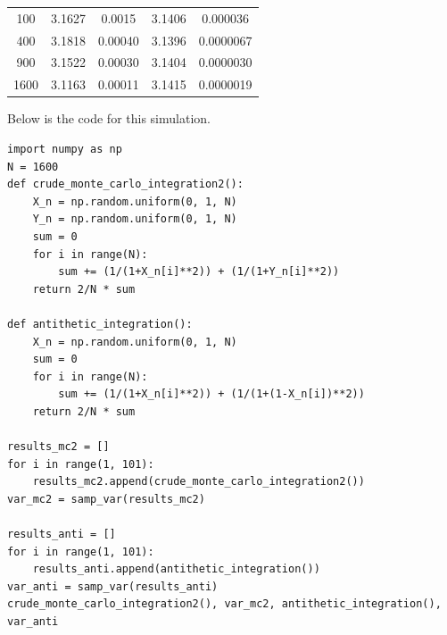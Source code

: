 \documentclass[12pt, letterpaper]{article}
\begin{document}
\begin{enumerate}[a.]
\begin{center}
\begin{tabular}{c | c c | c c}
        \hline 
        100 & 3.1627 & 0.0015 & 3.1406 & 0.000036 \\
        400 & 3.1818 & 0.00040 & 3.1396 & 0.0000067 \\
        900 & 3.1522 & 0.00030 & 3.1404 & 0.0000030 \\
        1600 & 3.1163 & 0.00011 & 3.1415 & 0.0000019 \\
    \end{tabular}
    \end{center}
    Below is the code for this simulation.
    \begin{verbatim}
import numpy as np
N = 1600 
def crude_monte_carlo_integration2():
    X_n = np.random.uniform(0, 1, N)
    Y_n = np.random.uniform(0, 1, N)
    sum = 0 
    for i in range(N):
        sum += (1/(1+X_n[i]**2)) + (1/(1+Y_n[i]**2))
    return 2/N * sum

def antithetic_integration():
    X_n = np.random.uniform(0, 1, N)
    sum = 0
    for i in range(N):
        sum += (1/(1+X_n[i]**2)) + (1/(1+(1-X_n[i])**2))
    return 2/N * sum

results_mc2 = []
for i in range(1, 101):
    results_mc2.append(crude_monte_carlo_integration2())
var_mc2 = samp_var(results_mc2)

results_anti = []
for i in range(1, 101):
    results_anti.append(antithetic_integration())
var_anti = samp_var(results_anti)
crude_monte_carlo_integration2(), var_mc2, antithetic_integration(), var_anti
    \end{verbatim}
\end{enumerate}
\end{document}
